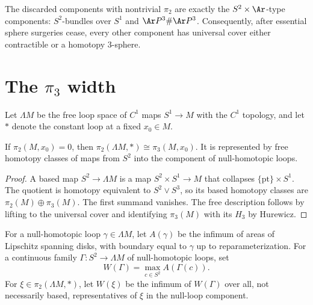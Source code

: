 \begin{remark}
\label{rem:pi2-disappearing-components}
The discarded components with nontrivial $\pi_2$ are exactly the
$S^2\times\Ar$-type components: $S^2$-bundles over $S^1$ and
$\Ar P^3\#\Ar P^3$. Consequently, after essential sphere surgeries cease,
every other component has universal cover either contractible or a homotopy
$3$-sphere.
\end{remark}

\section{The $\pi_3$ width}

Let $\Lambda M$ be the free loop space of $C^1$ maps $S^1\to M$ with the
$C^1$ topology, and let $*$ denote the constant loop at a fixed $x_0\in M$.

\begin{claim}
\label{claim:loop-space-pi2-pi3-iso}
If $\pi_2(M,x_0)=0$, then
$\pi_2(\Lambda M,*)\cong\pi_3(M,x_0)$. It is represented by free homotopy
classes of maps from $S^2$ into the component of null-homotopic loops.
\end{claim}
\begin{proof}
\sketch A based map $S^2\to\Lambda M$ is a map $S^2\times S^1\to M$ that
collapses $\{\mathrm{pt}\}\times S^1$. The quotient is homotopy equivalent to
$S^2\vee S^3$, so its based homotopy classes are
$\pi_2(M)\oplus\pi_3(M)$. The first summand vanishes. The free description
follows by lifting to the universal cover and identifying $\pi_3(M)$ with its
$H_3$ by Hurewicz.
\end{proof}

\begin{definition}
\label{def:w-xi-spanning-disk-functional}
\label{Wdefn}
For a null-homotopic loop $\gamma\in\Lambda M$, let $A(\gamma)$ be the
infimum of areas of Lipschitz spanning disks, with boundary equal to $\gamma$
up to reparameterization. For a continuous family
$\Gamma\colon S^2\to\Lambda M$ of null-homotopic loops, set
\[
W(\Gamma)=\max_{c\in S^2}A(\Gamma(c)).
\]
For $\xi\in\pi_2(\Lambda M,*)$, let $W(\xi)$ be the infimum of $W(\Gamma)$
over all, not necessarily based, representatives of $\xi$ in the null-loop
component.
\end{definition}

